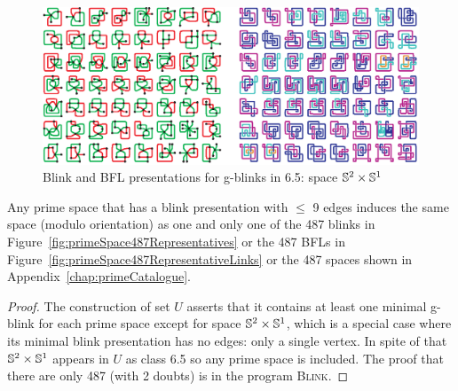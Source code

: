 \begin{figure}[h!tp]
   \begin{center}
      \leavevmode
      \includegraphics[width=14cm]{fig/gblinksForS1xS2inU.eps}
   \end{center}
   \vspace{-0.7cm}
   \caption{ Blink and BFL presentations for g-blinks in 6.5: space $\mathbb{S}^2 \times \mathbb{S}^1$}
   \label{fig:gblinksForS1xS2inU}
\end{figure}


\begin{Theo}
\label{theo:primeSpacesUpTo9Edges}
Any prime space that has a blink presentation with $\leq$ 9 edges induces the
same space (modulo orientation) as one and only one of the 487 blinks in
Figure~\ref{fig:primeSpace487Representatives} or the 487 BFLs in
Figure~\ref{fig:primeSpace487RepresentativeLinks} or the 487 spaces shown
in Appendix~\ref{chap:primeCatalogue}.
\end{Theo}

\enlargethispage{2cm}

\begin{proof}
The construction of set $U$ asserts that it contains at least one minimal
g-blink for each prime space except for space $\mathbb{S}^2 \times \mathbb{S}^1$,
which is a special case where its minimal blink presentation
has no edges: only a single vertex. In spite of that $\mathbb{S}^2 \times \mathbb{S}^1$
appears in $U$ as class 6.5 so any prime space is included. The proof
that there are only 487 (with 2 doubts) is in the program \textsc{Blink}.
\end{proof}



\newpage

